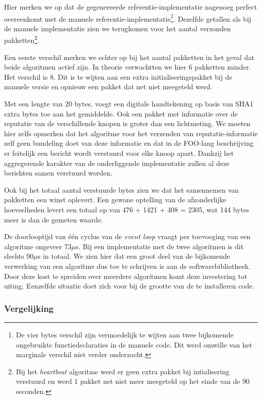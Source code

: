 Hier merken we op dat de gegenereerde referentie-implementatie nagenoeg perfect
overeenkomt met de manuele referentie-implementatie\footnote{De vier bytes
verschil zijn vermoedelijk te wijten aan twee bijkomende ongebruikte
functiedeclaraties in de manuele code. Dit werd omwille van het marginale
verschil niet verder onderzocht.}. Dezelfde getallen als bij de manuele
implementatie zien we terugkomen voor het aantal verzonden
pakketten\footnote{Bij het \emph{heartbeat} algoritme werd er geen extra pakket
bij intialisering verstuurd en werd 1 pakket net niet meer meegeteld op het
einde van de 90 seconden.}.

Een eerste verschil merken we echter op bij het aantal pakketten in het geval
dat beide algoritmen actief zijn. In theorie verwachtten we hier 6 pakketten
minder. Het verschil is 8. Dit is te wijten aan een extra initialiseringspakket
bij de manuele versie en opnieuw een pakket dat net niet meegeteld werd.

Met een lengte van 20 bytes, voegt een digitale handtekening op basis van SHA1
extra bytes toe aan het gemiddelde. Ook een pakket met informatie over de
reputatie van de verschillende knopen is groter dan een lichtmeting. We moeten
hier zelfs opmerken dat het algoritme voor het verzenden van
reputatie-informatie zelf geen bundeling doet van deze informatie en dat in de
FOO-lang beschrijving er feitelijk een bericht wordt verstuurd voor elke knoop
apart. Dankzij het aggregerende karakter van de onderliggende implementatie
zullen al deze berichten samen verstuurd worden.

Ook bij het totaal aantal verstuurde bytes zien we dat het samennemen van
pakketten een winst oplevert. Een gewone optelling van de afzonderlijke
hoeveelheden levert een totaal op van 476 + 1421 + 408 = 2305, wat 144 bytes
meer is dan de gemeten waarde.

De doorlooptijd van \'e\'en cyclus van de \emph{event loop} vraagt per
toevoeging van een algoritme ongeveer 73$\mu$s. Bij een implementatie met de
twee algoritmen is dit slechts 90$\mu$s in totaal. We zien hier dat een groot
deel van de bijkomende verwerking van een algoritme dus toe te schrijven is aan
de softwarebibliotheek. Door deze kost te spreiden over meerdere algoritmen
komt deze investering tot uiting. Eenzelfde situatie doet zich voor bij de
grootte van de te installeren code.

\vspace{-3mm}

\subsubsection{Vergelijking}

